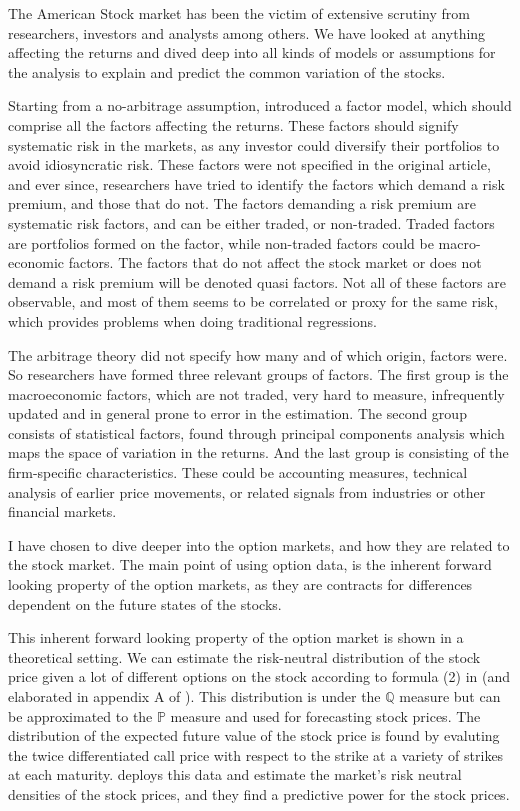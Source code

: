 

The American Stock market has been the victim of extensive scrutiny from researchers, investors and analysts among others. We have looked at anything affecting the returns and dived deep into all kinds of models or assumptions for the analysis to explain and predict the common variation of the stocks. 

Starting from a no-arbitrage assumption, \cite{ross1976arbitrage} introduced a factor model, which should comprise all the factors affecting the returns. These factors should signify systematic risk in the markets, as any investor could diversify their portfolios to avoid idiosyncratic risk. These factors were not specified in the original article, and ever since, researchers have tried to identify the factors which demand a risk premium, and those that do not. The factors demanding a risk premium are systematic risk factors, and can be either traded, or non-traded. Traded factors are portfolios formed on the factor, while non-traded factors could be macro-economic factors. The factors that do not affect the stock market or does not demand a risk premium will be denoted quasi factors. Not all of these factors are observable, and most of them seems to be correlated or proxy for the same risk, which provides problems when doing traditional regressions.

The arbitrage theory did not specify how many and of which origin, factors were. So researchers have formed three relevant groups of factors. The first group is the macroeconomic factors, which are not traded, very hard to measure, infrequently updated and in general prone to error in the estimation. The second group consists of statistical factors, found through principal components analysis which maps the space of variation in the returns. And the last group is consisting of the firm-specific characteristics. These could be accounting measures, technical analysis of earlier price movements, or related signals from industries or other financial markets. 



I have chosen to dive deeper into the option markets, and how they are related to the stock market. The main point of using option data, is the inherent forward looking property of the option markets, as they are contracts for differences dependent on the future states of the stocks. 

This inherent forward looking property of the option market is shown in a theoretical setting. We can estimate the risk-neutral distribution of the stock price given a lot of different options on the stock according to formula (2) in \cite{breeden1978prices} (and elaborated in appendix A of \cite{isakasoption}). This distribution is under the $\mathbb{Q}$ measure but can be approximated to the $\mathbb{P}$ measure and used for forecasting stock prices. The distribution of the expected future value of the stock price is found by evaluting the twice differentiated call price with respect to the strike at a variety of strikes at each maturity. \cite{figlewski1993options} deploys this data and estimate the market's risk neutral densities of the stock prices, and they find a predictive power for the stock prices.

